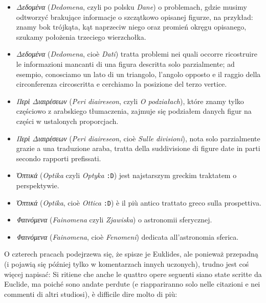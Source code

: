 \begin{itemize}
\item \emph{Δεδομένα} (\emph{Dedomena}, czyli po polsku \emph{Dane}) o problemach, gdzie musimy odtworzyć brakujące informacje o szczątkowo opisanej figurze, na przykład: znamy bok trójkąta, kąt naprzeciw niego oraz promień okręgu opisanego, szukamy położenia trzeciego wierzchołka. %
\item \emph{Δεδομένα} (\emph{Dedomena}, cioè \emph{Dati}) tratta problemi nei quali occorre ricostruire le informazioni mancanti di una figura descritta solo parzialmente; ad esempio, conosciamo un lato di un triangolo, l'angolo opposto e il raggio della circonferenza circoscritta e cerchiamo la posizione del terzo vertice. %

\item \emph{Περὶ Διαιρέσεων} (\emph{Peri diaireseon}, czyli \emph{O podziałach}), które znamy tylko częściowo z arabskiego tłumaczenia, zajmuje się podziałem danych figur na części w ustalonych proporcjach. %
\item \emph{Περὶ Διαιρέσεων} (\emph{Peri diaireseon}, cioè \emph{Sulle divisioni}), nota solo parzialmente grazie a una traduzione araba, tratta della suddivisione di figure date in parti secondo rapporti prefissati. %

\item \emph{Ὀπτικά} (\emph{Optika} czyli \emph{Optyka} \texttt{:D}) jest najstarszym greckim traktatem o perspektywie. %
\item \emph{Ὀπτικά} (\emph{Optika}, cioè \emph{Ottica} \texttt{:D}) è il più antico trattato greco sulla prospettiva. %

\item \emph{Φαινόμενα} (\emph{Fainomena} czyli \emph{Zjawiska}) o astronomii sferycznej. %
\item \emph{Φαινόμενα} (\emph{Fainomena}, cioè \emph{Fenomeni}) dedicata all'astronomia sferica. %
\end{itemize}

O czterech pracach podejrzewa się, że spisze je Euklides, ale ponieważ przepadną (i pojawią się później tylko w komentarzach innych uczonych), trudno jest coś więcej napisać: %
Si ritiene che anche le quattro opere seguenti siano state scritte da Euclide, ma poiché sono andate perdute (e riappariranno solo nelle citazioni e nei commenti di altri studiosi), è difficile dire molto di più: %

